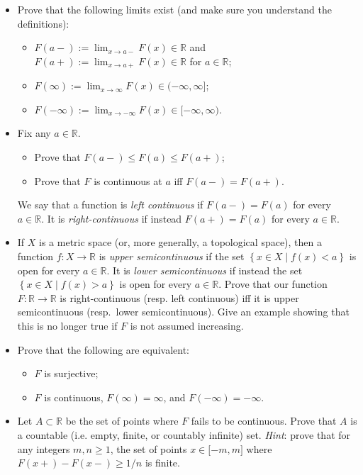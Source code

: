 \documentclass{qlnotes-export}
\begin{document}
\begin{itemize}
\item
  Prove that the following limits exist (and make sure you understand the definitions):

  \begin{itemize}
  \item
    \(F(a - ) := \lim_{x\rightarrow a -}F(x) \in {\mathbb{R}}\) and \(F(a + ) := \lim_{x\rightarrow a +}F(x) \in {\mathbb{R}}\) for \(a \in {\mathbb{R}}\);
  \item
    \(F(\infty) := \lim_{x\rightarrow\infty}F(x) \in ( - \infty,\infty\rbrack\);
  \item
    \(F( - \infty) := \lim_{x\rightarrow - \infty}F(x) \in \lbrack - \infty,\infty)\).
  \end{itemize}
\item
  Fix any \(a \in {\mathbb{R}}\).

  \begin{itemize}
  \item
    Prove that \(F(a - ) \leq F(a) \leq F(a + )\);
  \item
    Prove that \(F\) is continuous at \(a\) iff \(F(a - ) = F(a + )\).
  \end{itemize}

  We say that a function is \emph{left continuous} if \(F(a - ) = F(a)\) for every \(a \in {\mathbb{R}}\). It is \emph{right-continuous} if instead \(F(a + ) = F(a)\) for every \(a \in {\mathbb{R}}\).
\item
  If \(X\) is a metric space (or, more generally, a topological space), then a function \(f:X\rightarrow{\mathbb{R}}\) is \emph{upper semicontinuous} if the set \(\left\{ {x \in X \mid f(x) < a} \right\}\) is open for every \(a \in {\mathbb{R}}\). It is \emph{lower semicontinuous} if instead the set \(\left\{ {x \in X \mid f(x) > a} \right\}\) is open for every \(a \in {\mathbb{R}}\). Prove that our function \(F:{\mathbb{R}}\rightarrow{\mathbb{R}}\) is right-continuous (resp. left continuous) iff it is upper semicontinuous (resp.~lower semicontinuous). Give an example showing that this is no longer true if \(F\) is not assumed increasing.
\item
  Prove that the following are equivalent:

  \begin{itemize}
  \item
    \(F\) is surjective;
  \item
    \(F\) is continuous, \(F(\infty) = \infty\), and \(F( - \infty) = - \infty\).
  \end{itemize}
\item
  Let \(A \subset {\mathbb{R}}\) be the set of points where \(F\) fails to be continuous. Prove that \(A\) is a countable (i.e. empty, finite, or countably infinite) set. \emph{Hint}: prove that for any integers \(m,n \geq 1\), the set of points \(x \in \lbrack - m,m\rbrack\) where \(F(x + ) - F(x - ) \geq 1/n\) is finite.
\end{itemize}
\end{document}
